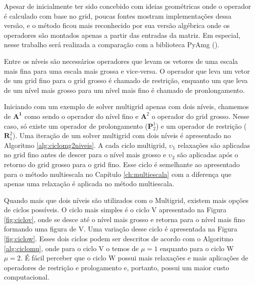 Apesar de inicialmente ter sido concebido com ideias geométricas onde o operador é calculado com base no grid, poucas fontes mostram implementações dessa versão, e o método ficou mais reconhecido por sua versão algébrica onde os operadores são montados apenas a partir das entradas da matriz. Em especial, nesse trabalho será realizada a comparação com a biblioteca PyAmg (\citet{OlSc2018}).


Entre os níveis são necessários operadores que levam os vetores de uma escala mais fina para uma escala mais grossa e vice-versa. O operador que leva um vetor de um grid fino para o grid grosso é chamado de restrição, enquanto um que leva de um nível mais grosso para um nível mais fino é chamado de pronlongamento. 


Iniciando com um exemplo de solver multigrid apenas com dois níveis, chamemos de $\mathbf{A^1}$ como sendo o operador do nível fino e $\mathbf{A}^2$ o operador do grid grosso. Nesse caso, só existe um operador de prolongamento ($\mathbf{P}_2^1$) e um operador de restrição ($\mathbf{R}^2_1$). Uma iteração de um solver multigrid com dois níveis é apresentado no Algoritmo \ref{alg:ciclomg2niveis}. A cada ciclo multigrid, $\upsilon_1$ relaxações são aplicadas no grid fino antes de descer para o nível mais grosso e $\upsilon_2$ são aplicadas após o retorno do grid grosso para o grid fino. Esse ciclo é semelhante ao apresentado para o método multiescala no Capítulo \ref{ch:multiescala} com a diferença que apenas uma relaxação é aplicada no método multiescala.


Quando mais que dois níveis são utilizados com o Multigrid, existem mais opções de ciclos possíveis. O ciclo mais simples é o ciclo V apresentado na Figura \ref{fig:ciclov}, onde se desce até o nível mais grosso e retorna para o nível mais fino formando uma figura de V. Uma variação desse ciclo é apresentada na Figura \ref{fig:ciclow}. Esses dois ciclos podem ser descritos de acordo com o Algoritmo \ref{alg:ciclomu}, onde para o ciclo V o temos de $\mu = 1$ enquanto para o ciclo W $\mu = 2$. É fácil perceber que o ciclo W possui mais relaxações e mais aplicações de operadores de restrição e prologamento e, portanto, possui um maior custo computacional.

